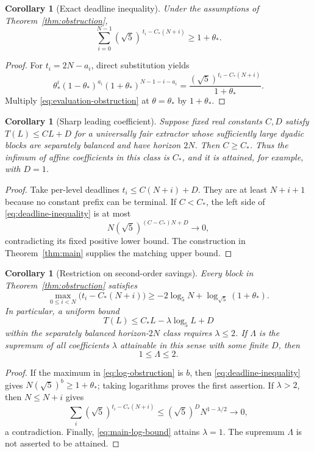 \documentclass[11pt]{article}
\newtheorem{corollary}[theorem]{Corollary}
\theoremstyle{definition}
\theoremstyle{remark}
\begin{document}
\begin{corollary}[Exact deadline inequality]\label{cor:deadline}
Under the assumptions of Theorem~\ref{thm:obstruction},
\begin{equation}\label{eq:deadline-inequality}
 \boxed{\displaystyle
 \sum_{i=0}^{N-1}(\sqrt5)^{\,t_i-C_*(N+i)}\ge1+\theta_* .}
\end{equation}
\end{corollary}
\begin{proof}
For $t_i=2N-a_i$, direct substitution yields
\[
 \theta_*^i(1-\theta_*)^{a_i}(1+\theta_*)^{N-1-i-a_i}
 =\frac{(\sqrt5)^{t_i-C_*(N+i)}}{1+\theta_*}.
\]
Multiply \eqref{eq:evaluation-obstruction} at $\theta=\theta_*$ by
$1+\theta_*$.
\end{proof}

\begin{corollary}[Sharp leading coefficient]\label{cor:framework-optimal}
Suppose fixed real constants $C,D$ satisfy $T(L)\le CL+D$ for a
universally fair extractor whose sufficiently large dyadic blocks are
separately balanced and have horizon $2N$. Then $C\ge C_*$. Thus the
infimum of affine coefficients in this class is $C_*$, and it is
attained, for example, with $D=1$.
\end{corollary}
\begin{proof}
Take per-level deadlines $t_i\le C(N+i)+D$. They are at least $N+i+1$
because no constant prefix can be terminal. If $C<C_*$, the left side
of \eqref{eq:deadline-inequality} is at most
\[
 N(\sqrt5)^{(C-C_*)N+D}\longrightarrow0,
\]
contradicting its fixed positive lower bound. The construction in
Theorem~\ref{thm:main} supplies the matching upper bound.
\end{proof}

\begin{corollary}[Restriction on second-order savings]\label{cor:second-order}
Every block in Theorem~\ref{thm:obstruction} satisfies
\begin{equation}\label{eq:log-obstruction}
 \max_{0\le i<N}\bigl(t_i-C_*(N+i)\bigr)
 \ge-2\log_5N+\log_{\sqrt5}(1+\theta_*).
\end{equation}
In particular, a uniform bound
\[
 T(L)\le C_*L-\lambda\log_5L+D
\]
within the separately balanced horizon-$2N$ class requires $\lambda\le2$.
If $\Lambda$ is the supremum of all coefficients $\lambda$ attainable
in this sense with some finite $D$, then
\begin{equation}\label{eq:lambda-range}
 1\le\Lambda\le2.
\end{equation}
\end{corollary}
\begin{proof}
If the maximum in \eqref{eq:log-obstruction} is $b$, then
\eqref{eq:deadline-inequality} gives $N(\sqrt5)^b\ge1+\theta_*$;
taking logarithms proves the first assertion. If $\lambda>2$, then
$N\le N+i$ gives
\[
 \sum_i(\sqrt5)^{t_i-C_*(N+i)}
 \le (\sqrt5)^D N^{1-\lambda/2}\longrightarrow0,
\]
a contradiction. Finally, \eqref{eq:main-log-bound} attains $\lambda=1$.
The supremum $\Lambda$ is not asserted to be attained.
\end{proof}
\end{document}
